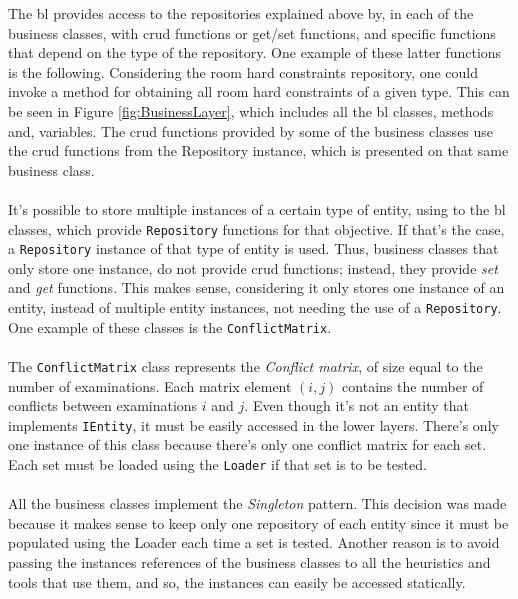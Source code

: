 The \gls{bl} provides access to the repositories explained above by, in each of the business classes, with \gls{crud} functions or get/set functions, and specific functions that depend on the type of the repository. One example of these latter functions is the following. Considering the room hard constraints repository, one could invoke a method for obtaining all room hard constraints of a given type. This can be seen in Figure \ref{fig:BusinessLayer}, which includes all the \gls{bl} classes, methods and, variables. The \gls{crud} functions provided by some of the business classes use the \gls{crud} functions from the Repository instance, which is presented on that same business class.\\
\\
It's possible to store multiple instances of a certain type of entity, using to the \gls{bl} classes, which provide \verb+Repository+ functions for that objective. If that's the case, a \verb+Repository+ instance of that type of entity is used. Thus, business classes that only store one instance, do not provide \gls{crud} functions; instead, they provide \textit{set} and \textit{get} functions. This makes sense, considering it only stores one instance of an entity, instead of multiple entity instances, not needing the use of a \verb+Repository+. One example of these classes is the \verb+ConflictMatrix+. \\
\\
The \verb+ConflictMatrix+ class represents the \textit{Conflict matrix}, of size equal to the number of examinations. Each matrix element $(i,j)$ contains the number of conflicts between examinations $i$ and $j$. Even though it's not an entity that implements \verb+IEntity+, it must be easily accessed in the lower layers. There's only one instance of this class because there's only one conflict matrix for each set. Each set must be loaded using the \verb+Loader+ if that set is to be tested.\\
\\
All the business classes implement the \textit{Singleton} pattern. This decision was made because it makes sense to keep only one repository of each entity since it must be populated using the Loader each time a set is tested. Another reason is to avoid passing the instances references of the business classes to all the heuristics and tools that use them, and so, the instances can easily be accessed statically.\\

